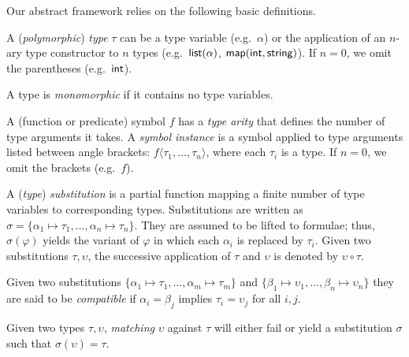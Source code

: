 \documentclass[runningheads]{llncs}
\begin{document}
Our abstract framework relies on the following basic definitions.

\begin{definition}
A (\emph{polymorphic}) \emph{type} \(\tau\) can be a type variable (e.g.\ \(\alpha\)) or
the application of an \(n\)-ary type constructor to \(n\) types (e.g.\ \(\textsf{list}(\alpha)\), \(\textsf{map}(\textsf{int},\textsf{string})\)).
If $n = 0$, we omit the parentheses (e.g.\ \(\textsf{int}\)).
\end{definition}

\begin{definition}
A type is \emph{monomorphic} if it contains no type variables.
\end{definition}

\begin{definition}
A (function or predicate) {symbol} \(f\) has a \emph{type arity} that defines the number of type arguments it takes. A \emph{symbol instance} is a symbol applied to type arguments listed between angle brackets: \(f\langle \tau_1, \dots, \tau_n\rangle\), where each $\tau_i$ is a type. If $n = 0$, we omit the brackets (e.g.\ $f$).
\end{definition}

\begin{definition}
A (\emph{type}) \emph{substitution} is a partial function mapping a finite number of type variables to corresponding types. Substitutions are written as
$\sigma = \{\alpha_1\mapsto\tau_1, \dots, \alpha_n\mapsto\tau_n\}$. They are assumed to be lifted to formulae; thus, $\sigma(\varphi)$ yields the variant of $\varphi$ in which each $\alpha_i$ is replaced by $\tau_i$.
Given two substitutions \(\tau, \upsilon\), the successive application of \(\tau\) and \(\upsilon\) is denoted by \(\upsilon \circ \tau\).
\end{definition}

\begin{definition}
Given two substitutions \(\{\alpha_1 \mapsto \tau_1, \dots, \alpha_m\mapsto\tau_m\}\) and \(\{\beta_1 \mapsto \upsilon_1, \dots, \beta_n\mapsto\upsilon_n\}\) they are said to be \emph{compatible} if \(\alpha_i = \beta_j\) implies \(\tau_i = \upsilon_j\) for all \(i, j\).
\end{definition}


\begin{definition}
Given two types \(\tau, \upsilon\), \emph{matching} \(\upsilon\) against \(\tau\) will either fail or yield a substitution \(\sigma\) such that \(\sigma(\upsilon) = \tau\).
\end{definition}
\end{document}
